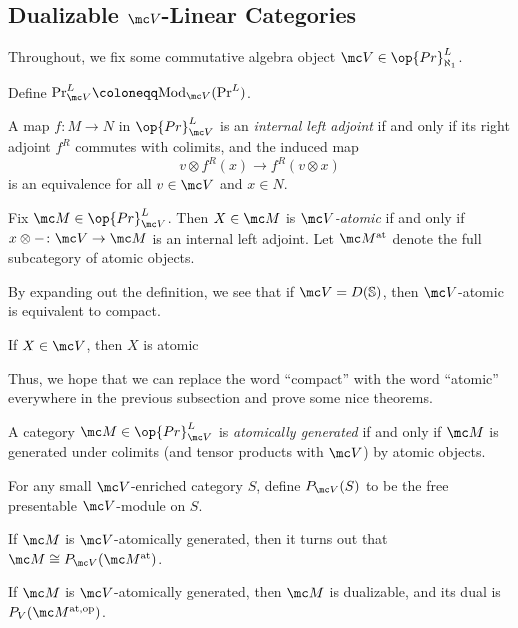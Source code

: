 \documentclass[../notes.tex]{subfiles}
\begin{document}
\subsection{Dualizable \texorpdfstring{$\mc V$}{ V}-Linear Categories}
Throughout, we fix some commutative algebra object $\mc V\in\op{Pr}^L_{\aleph_1}$.
\begin{notation}
	Define $\mathrm{Pr}^L_{\mc V}\coloneqq\mathrm{Mod}_{\mc V}(\mathrm{Pr}^L)$.
\end{notation}
\begin{definition}
	A map $f\colon M\to N$ in $\op{Pr}^L_{\mc V}$ is an \textit{internal left adjoint} if and only if its right adjoint $f^R$ commutes with colimits, and the induced map
	\[v\otimes f^R(x)\to f^R(v\otimes x)\]
	is an equivalence for all $v\in\mc V$ and $x\in N$.
\end{definition}
\begin{definition}[atomic]
	Fix $\mc M\in\op{Pr}^L_{\mc V}$. Then $X\in\mc M$ is \textit{$\mc V$-atomic} if and only if $x\otimes-\colon\mc V\to\mc M$ is an internal left adjoint. Let $\mc M^{\mathrm{at}}$ denote the full subcategory of atomic objects.
\end{definition}
\begin{example}
	By expanding out the definition, we see that if $\mc V=D(\mathbb S)$, then $\mc V$-atomic is equivalent to compact.
\end{example}
\begin{example}
	If $X\in\mc V$, then $X$ is atomic
\end{example}
Thus, we hope that we can replace the word ``compact'' with the word ``atomic'' everywhere in the previous subsection and prove some nice theorems.
\begin{definition}
	A category $\mc M\in\op{Pr}^L_{\mc V}$ is \textit{atomically generated} if and only if $\mc M$ is generated under colimits (and tensor products with $\mc V$) by atomic objects.
\end{definition}
\begin{definition}
	For any small $\mc V$-enriched category $S$, define $P_{\mc V}(S)$ to be the free presentable $\mc V$-module on $S$.
\end{definition}
\begin{remark}
	If $\mc M$ is $\mc V$-atomically generated, then it turns out that $\mc M\cong P_{\mc V}(\mc M^{\mathrm{at}})$.
\end{remark}
\begin{proposition}
	If $\mc M$ is $\mc V$-atomically generated, then $\mc M$ is dualizable, and its dual is $P_V(\mc M^{\mathrm{at},\mathrm{op}})$.
\end{proposition}
\end{document}

